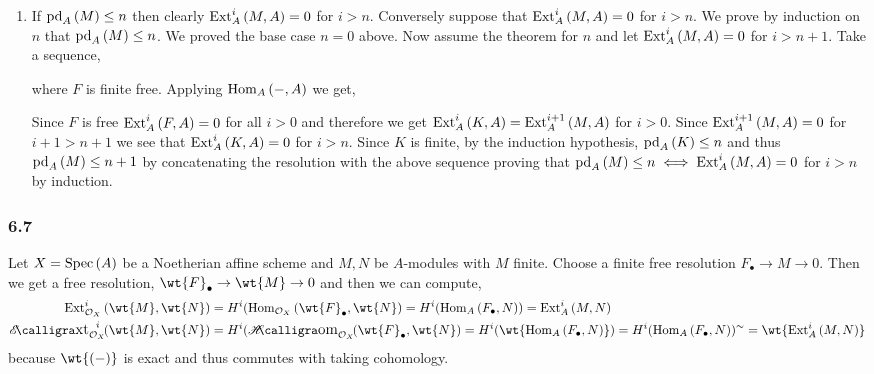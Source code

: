 \documentclass[12pt]{article}
\begin{document}
\begin{enumerate}
\item If $\mathrm{pd}_{A}\left(M \right) \le n$ then clearly $\mathrm{Ext}^{i}_{A} \left( M, A \right) = 0$ for $i > n$. Conversely suppose that $\mathrm{Ext}^{i}_{A} \left( M, A \right) = 0$ for $i > n$. We prove by induction on $n$ that $\mathrm{pd}_{A}\left(M \right) \le n$. We proved the base case $n = 0$ above. Now assume the theorem for $n$ and let $\mathrm{Ext}^{i}_{A} \left( M, A \right) = 0$ for $i > n+1$. Take a sequence,
\begin{center}
\end{center}
where $F$ is finite free. Applying $\mathrm{Hom}_{A} \left( -, A \right)$ we get,
\begin{center}
\end{center}
Since $F$ is free $\mathrm{Ext}^{i}_{A} \left( F, A \right) = 0$ for all $i > 0$ and therefore we get $\mathrm{Ext}^{i}_{A} \left( K, A \right) = \mathrm{Ext}^{i+1}_{A} \left( M, A \right)$ for $i > 0$. Since $\mathrm{Ext}^{i+1}_{A} \left( M, A \right) = 0$ for $i+1 > n+1$ we see that $\mathrm{Ext}^{i}_{A} \left( K, A \right) = 0$ for $i > n$. Since $K$ is finite, by the induction hypothesis, $\mathrm{pd}_{A}\left(K \right) \le n$ and thus $\mathrm{pd}_{A}\left(M \right) \le n + 1$ by concatenating the resolution with the above sequence proving that $\mathrm{pd}_{A}\left(M \right) \le n \iff \mathrm{Ext}^{i}_{A} \left( M, A \right) = 0$ for $i > n$ by induction. 
\end{enumerate}

\subsubsection{6.7}

Let $X = \mathrm{Spec}\left( A \right)$ be a Noetherian affine scheme and $M, N$ be $A$-modules with $M$ finite. Choose a finite free resolution $F_\bullet \to M \to 0$. Then we get a free resolution, $\wt{F}_\bullet \to \wt{M} \to 0$ and then we can compute,
\begin{align*}
\Ext{i}{\struct{X}}{\wt{M}}{\wt{N}} & = H^i(\Hom{\struct{X}}{\wt{F}_\bullet}{\wt{N}} = H^i(\Hom{A}{F_\bullet}{N}) = \Ext{i}{A}{M}{N} 
\\
\shExt{i}{\struct{X}}{\wt{M}}{\wt{N}} & = H^i(\shHom{\struct{X}}{\wt{F}_\bullet}{\wt{N}} = H^i(\wt{\Hom{A}{F_\bullet}{N}}) = H^i(\Hom{A}{F_\bullet}{N})^\sim = \wt{\Ext{i}{A}{M}{N}} 
\end{align*}
because $\wt{(-)}$ is exact and thus commutes with taking cohomology. 
\end{document}
